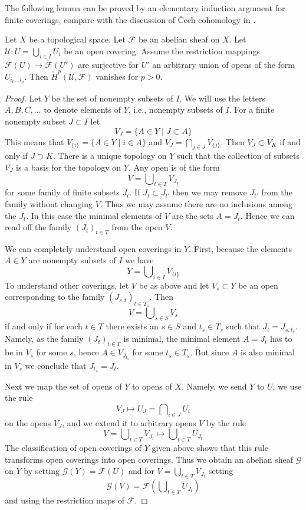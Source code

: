 \noindent
The following lemma can be proved by an elementary induction
argument for finite coverings, compare with the discussion
of {\v C}ech cohomology in \cite{FOAG}.

\begin{lemma}
\label{lemma-vanishing-ravi}
Let $X$ be a topological space. Let $\mathcal{F}$ be an abelian sheaf
on $X$. Let $\mathcal{U} : U = \bigcup_{i \in I} U_i$ be an
open covering. Assume the restriction mappings
$\mathcal{F}(U) \to \mathcal{F}(U')$ are surjective
for $U'$ an arbitrary union of opens of the form $U_{i_0 \ldots i_p}$.
Then $\check{H}^p(\mathcal{U}, \mathcal{F})$
vanishes for $p > 0$.
\end{lemma}

\begin{proof}
Let $Y$ be the set of nonempty subsets of $I$. We will use the letters
$A, B, C, \ldots$ to denote elements of $Y$, i.e., nonempty subsets of $I$.
For a finite nonempty subset $J \subset I$ let
$$
V_J = \{A \in Y \mid J \subset A\}
$$
This means that $V_{\{i\}} = \{A \in Y \mid i \in A\}$ and
$V_J = \bigcap_{j \in J} V_{\{j\}}$.
Then $V_J \subset V_K$ if and only if $J \supset K$.
There is a unique topology on $Y$ such that the collection of
subsets $V_J$ is a basis for the topology on $Y$. Any open is of the form
$$
V = \bigcup\nolimits_{t \in T} V_{J_t}
$$
for some family of finite subsets $J_t$. If $J_t \subset J_{t'}$
then we may remove $J_{t'}$ from the family without changing $V$.
Thus we may assume there are no inclusions among the $J_t$.
In this case the minimal elements of $V$ are the sets $A = J_t$.
Hence we can read off the family $(J_t)_{t \in T}$ from the open $V$.

\medskip\noindent
We can completely understand open coverings in $Y$. First, because
the elements $A \in Y$ are nonempty subsets of $I$ we have
$$
Y = \bigcup\nolimits_{i \in I} V_{\{i\}}
$$
To understand other coverings, let $V$ be as above and let $V_s \subset Y$
be an open corresponding to the family $(J_{s, t})_{t \in T_s}$. Then
$$
V = \bigcup\nolimits_{s \in S} V_s
$$
if and only if for each $t \in T$ there exists an $s \in S$ and
$t_s \in T_s$ such that $J_t = J_{s, t_s}$. Namely, as the family
$(J_t)_{t \in T}$ is minimal, the minimal element $A = J_t$
has to be in $V_s$ for some $s$, hence $A \in V_{J_{t_s}}$ for some
$t_s \in T_s$. But since $A$ is also minimal in $V_s$ we conclude
that $J_{t_s} = J_t$.

\medskip\noindent
Next we map the set of opens of $Y$ to opens of $X$. Namely, we send
$Y$ to $U$, we use the rule
$$
V_J \mapsto U_J = \bigcap\nolimits_{i \in J} U_i
$$
on the opens $V_J$, and we extend it to arbitrary opens $V$ by the rule
$$
V = \bigcup\nolimits_{t \in T} V_{J_t}
\mapsto
\bigcup\nolimits_{t \in T} U_{J_t}
$$
The classification of open coverings of $Y$ given above shows that
this rule transforms open coverings into open coverings. Thus we obtain
an abelian sheaf $\mathcal{G}$ on $Y$ by setting
$\mathcal{G}(Y) = \mathcal{F}(U)$ and for
$V = \bigcup\nolimits_{t \in T} V_{J_t}$ setting
$$
\mathcal{G}(V) = \mathcal{F}\left(\bigcup\nolimits_{t \in T} U_{J_t}\right)
$$
and using the restriction maps of $\mathcal{F}$.


\end{proof}

